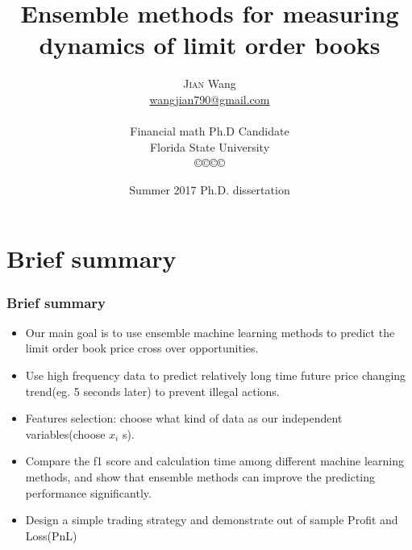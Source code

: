 \documentclass[xcolor={x11names,svgnames,dvipsnames}]{beamer}
\author[\textsc{Jian} Wang]{\textsc{Jian} Wang\\[1ex]%
{\small\url{wangjian790@gmail.com}\\[-.5ex]\url{}}\\
{\small{Financial math Ph.D Candidate}}\\
{\small{Florida State University}}\\
[0.8ex]\copyright\copyright\copyright\copyright} %
\title{Ensemble methods for measuring dynamics of limit order books}
\date[\textsc{Ph.D dissertation} 2017]{Summer 2017 Ph.D. dissertation\\ }%
\begin{document}
\begin{frame}
\maketitle
\end{frame}



\section{Brief summary}
\begin{frame}
\frametitle{Brief summary}
\begin{itemize}
	\item Our main goal is to use ensemble machine learning methods to predict the limit order book price \alert{cross over} opportunities.  	
	\item Use high frequency data to predict relatively \alert{long time} future price changing trend(eg. 5 seconds later) to prevent illegal actions.
     \item Features selection: choose what kind of data as our independent variables(\alert{choose $x_i$ s}).  
   	\item Compare the f1 score and calculation time  among different machine learning methods, and show that ensemble methods can improve the \alert{predicting performance} significantly. 
	
   	\item Design a simple trading strategy and demonstrate \alert{out of sample} Profit and Loss(PnL)
\end{itemize}
\end{frame}
\end{document}
